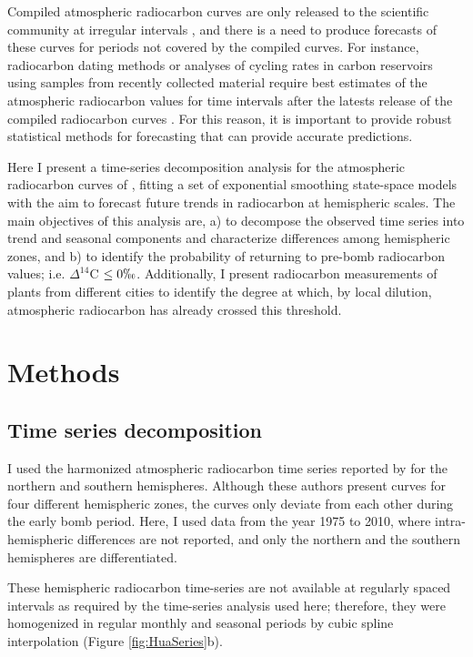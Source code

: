 \documentclass[a4paper, 11pt]{article}
\begin{document}
Compiled atmospheric radiocarbon curves are only released to the scientific community at irregular intervals \citep{Hua2004, Hua2013Radiocarbon}, and there is a need to produce forecasts of these curves for periods not covered by the compiled curves. For instance, radiocarbon dating methods or analyses of cycling rates in carbon reservoirs using samples from recently collected material require best estimates 
of the atmospheric radiocarbon values for time intervals after the latests release of the compiled radiocarbon curves \citep{SierraGMD14} . For this reason, it is important to provide robust statistical methods for forecasting that can provide accurate predictions. 

Here I present a time-series decomposition analysis for the atmospheric radiocarbon curves of \citet{Hua2013Radiocarbon}, fitting a set of exponential smoothing state-space models with the aim to forecast future trends in radiocarbon at hemispheric scales. The main objectives of this analysis are, a) to decompose the observed time series into trend and seasonal components and characterize differences among hemispheric zones, and b) to identify the probability of returning to pre-bomb radiocarbon values; i.e. $\Delta^{14}$C $\leq 0 \permil$. Additionally, I present radiocarbon measurements of plants from different cities to identify the degree at which, by local dilution, atmospheric radiocarbon has already crossed this threshold. 


\section{Methods}
\subsection{Time series decomposition} 
I used the harmonized atmospheric radiocarbon time series reported by \citet{Hua2013Radiocarbon} for the northern and southern hemispheres. Although these authors present curves for four different hemispheric zones, the curves only deviate from each other during
the early bomb period. Here, I used data from the year 1975 to 2010, where intra-hemispheric differences are not reported, and only
the northern and the southern hemispheres are differentiated. 

These hemispheric radiocarbon time-series are not available at regularly spaced intervals as required by the time-series analysis used here; therefore, they were homogenized in regular monthly and seasonal periods by cubic spline interpolation (Figure \ref{fig:HuaSeries}b).
\end{document}
